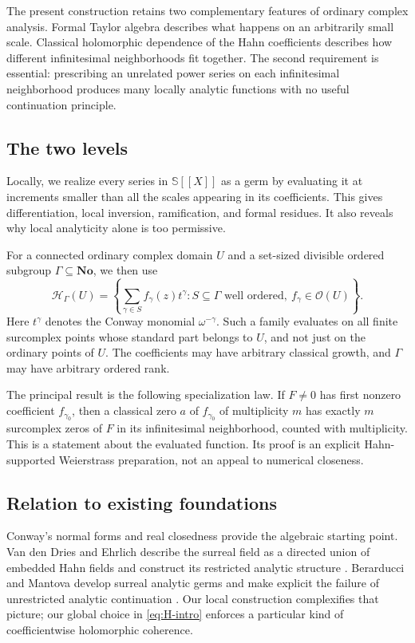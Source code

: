 \documentclass[11pt,a4paper]{article}
\theoremstyle{definition}
\theoremstyle{remark}
\newcommand{\No}{\mathbf{No}}
\newcommand{\SC}{\mathbb S}
\newcommand{\OO}{\mathcal O}
\newcommand{\HH}{\mathcal H}
\begin{document}
The present construction retains two complementary features of ordinary
complex analysis. Formal Taylor algebra describes what happens on an
arbitrarily small scale. Classical holomorphic dependence of the Hahn
coefficients describes how different infinitesimal neighborhoods fit
together. The second requirement is essential: prescribing an unrelated
power series on each infinitesimal neighborhood produces many locally
analytic functions with no useful continuation principle.

\subsection{The two levels}
Locally, we realize every series in $\SC[[X]]$ as a germ by evaluating it
at increments smaller than all the scales appearing in its coefficients.
This gives differentiation, local inversion, ramification, and formal
residues. It also reveals why local analyticity alone is too permissive.

For a connected ordinary complex domain $U$ and a set-sized divisible
ordered subgroup $\Gamma\subseteq\No$, we then use
\begin{equation}\label{eq:H-intro}
 \HH_\Gamma(U)=
 \left\{\sum_{\gamma\in S} f_\gamma(z)t^\gamma:
 S\subseteq\Gamma\text{ well ordered},\ f_\gamma\in\OO(U)\right\}.
\end{equation}
Here $t^\gamma$ denotes the Conway monomial $\omega^{-\gamma}$.
Such a family evaluates on all finite surcomplex points whose standard
part belongs to $U$, and not just on the ordinary points of $U$.
The coefficients may have arbitrary classical growth, and $\Gamma$ may
have arbitrary ordered rank.

The principal result is the following specialization law. If
$F\ne0$ has first nonzero coefficient $f_{\gamma_0}$, then a classical
zero $a$ of $f_{\gamma_0}$ of multiplicity $m$ has exactly $m$
surcomplex zeros of $F$ in its infinitesimal neighborhood, counted with
multiplicity. This is a statement about the evaluated function. Its
proof is an explicit Hahn-supported Weierstrass preparation, not an
appeal to numerical closeness.

\subsection{Relation to existing foundations}
Conway's normal forms and real closedness provide the algebraic starting
point. Van den Dries and Ehrlich describe the surreal field as a directed
union of embedded Hahn fields and construct its restricted analytic
structure \cite{vdDE}. Berarducci and Mantova develop surreal analytic
germs and make explicit the failure of unrestricted analytic
continuation \cite{BMgerms}. Our local construction complexifies that
picture; our global choice in \eqref{eq:H-intro} enforces a particular
kind of coefficientwise holomorphic coherence.
\end{document}
